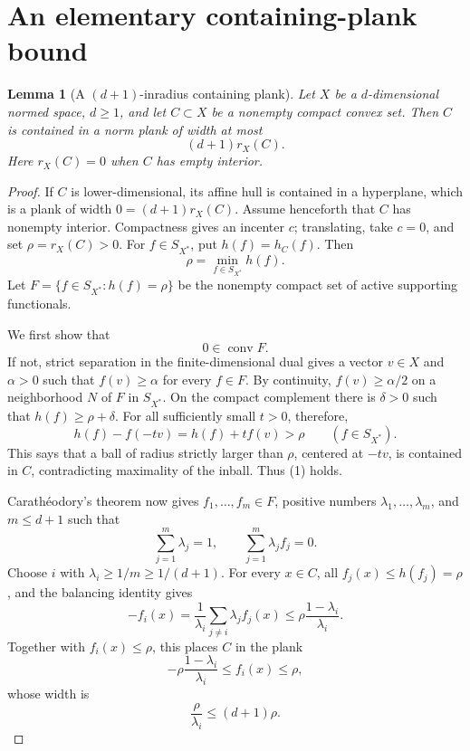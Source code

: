 \documentclass[11pt]{article}
\newtheorem{lemma}{Lemma}
\theoremstyle{remark}
\newcommand{\rin}{r_X}
\newcommand{\conv}{\operatorname{conv}}
\begin{document}
\section{An elementary containing-plank bound}

\begin{lemma}[A \((d+1)\)-inradius containing plank]
\label{lem:finite-plank}
Let \(X\) be a \(d\)-dimensional normed space, \(d\ge1\), and let
\(C\subset X\) be a nonempty compact convex set. Then \(C\) is contained in a
norm plank of width at most
\[
  (d+1)\rin(C).
\]
Here \(\rin(C)=0\) when \(C\) has empty interior.
\end{lemma}

\begin{proof}
If \(C\) is lower-dimensional, its affine hull is contained in a hyperplane,
which is a plank of width \(0=(d+1)\rin(C)\). Assume henceforth that \(C\) has
nonempty interior. Compactness gives an incenter \(c\); translating, take
\(c=0\), and set \(\rho=\rin(C)>0\). For \(f\in S_{X^*}\), put
\(h(f)=h_C(f)\). Then
\[
  \rho=\min_{f\in S_{X^*}}h(f).
\]
Let \(F=\{f\in S_{X^*}:h(f)=\rho\}\) be the nonempty compact set of active
supporting functionals.

We first show that
\[
  0\in\conv F. \tag{1}
\]
If not, strict separation in the finite-dimensional dual gives a vector
\(v\in X\) and \(\alpha>0\) such that \(f(v)\ge\alpha\) for every \(f\in F\).
By continuity, \(f(v)\ge\alpha/2\) on a neighborhood \(N\) of \(F\) in
\(S_{X^*}\). On the compact complement there is \(\delta>0\) such that
\(h(f)\ge\rho+\delta\). For all sufficiently small \(t>0\), therefore,
\[
  h(f)-f(-tv)=h(f)+t f(v)>\rho
  \qquad(f\in S_{X^*}).
\]
This says that a ball of radius strictly larger than \(\rho\), centered at
\(-tv\), is contained in \(C\), contradicting maximality of the inball. Thus
(1) holds.

Carath\'eodory's theorem now gives \(f_1,\ldots,f_m\in F\), positive numbers
\(\lambda_1,\ldots,\lambda_m\), and \(m\le d+1\) such that
\[
  \sum_{j=1}^m\lambda_j=1,
  \qquad \sum_{j=1}^m\lambda_j f_j=0.
\]
Choose \(i\) with \(\lambda_i\ge1/m\ge1/(d+1)\). For every \(x\in C\), all
\(f_j(x)\le h(f_j)=\rho\), and the balancing identity gives
\[
  -f_i(x)=\frac{1}{\lambda_i}
      \sum_{j\ne i}\lambda_j f_j(x)
  \le \rho\frac{1-\lambda_i}{\lambda_i}.
\]
Together with \(f_i(x)\le\rho\), this places \(C\) in the plank
\[
  -\rho\frac{1-\lambda_i}{\lambda_i}
  \le f_i(x)\le\rho,
\]
whose width is
\[
  \frac{\rho}{\lambda_i}\le(d+1)\rho.
\]
\end{proof}
\end{document}
